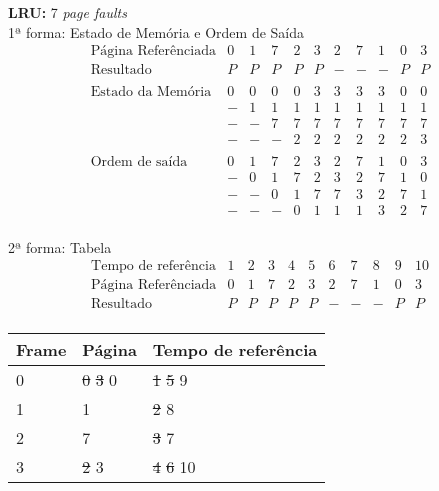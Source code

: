 \begin{exercicio}
  \textbf{LRU:} 7 \textit{page faults} \\

  1ª forma: Estado de Memória e Ordem de Saída
  \[
  \begin{array}{rcccccccccc}
    \text{Página Referênciada}
    & 0 & 1 & 7 & 2 & 3 & 2 & 7 & 1 & 0 & 3 \\ \hline
    \text{Resultado}
    & P & P & P & P & P & - & - & - & P & P \\
    \\
    \text{Estado da Memória}
    & 0 & 0 & 0 & 0 & 3 & 3 & 3 & 3 & 0 & 0 \\
    & - & 1 & 1 & 1 & 1 & 1 & 1 & 1 & 1 & 1 \\
    & - & - & 7 & 7 & 7 & 7 & 7 & 7 & 7 & 7 \\
    & - & - & - & 2 & 2 & 2 & 2 & 2 & 2 & 3 \\
    \\
    \text{Ordem de saída}
    & 0 & 1 & 7 & 2 & 3 & 2 & 7 & 1 & 0 & 3 \\
    & - & 0 & 1 & 7 & 2 & 3 & 2 & 7 & 1 & 0 \\
    & - & - & 0 & 1 & 7 & 7 & 3 & 2 & 7 & 1 \\
    & - & - & - & 0 & 1 & 1 & 1 & 3 & 2 & 7 \\
  \end{array}
  \]

2ª forma: Tabela
\[
\begin{array}{rcccccccccc}
  \text{Tempo de referência}
    & 1 & 2 & 3 & 4 & 5 & 6 & 7 & 8 & 9 & 10 \\ \hline
  \text{Página Referênciada}
    & 0 & 1 & 7 & 2 & 3 & 2 & 7 & 1 & 0 & 3 \\ \hline
  \text{Resultado}
    & P & P & P & P & P & - & - & - & P & P \\
\end{array}
 \]
\begin{table}[H]
  \centering
  \begin{tabular}{lll}
    \hline \hline
    \textbf{Frame}  & \textbf{Página}                   & \textbf{Tempo de referência} \\ \hline
    0               & \sout{0} \sout{3} 0               & \sout{1} \sout{5} 9 \\
    1               & 1                                 & \sout{2} 8 \\
    2               & 7                                 & \sout{3} 7 \\
    3               & \sout{2} 3                        & \sout{4} \sout{6} 10 \\
    \hline \hline
  \end{tabular}
\end{table}

\end{exercicio}


